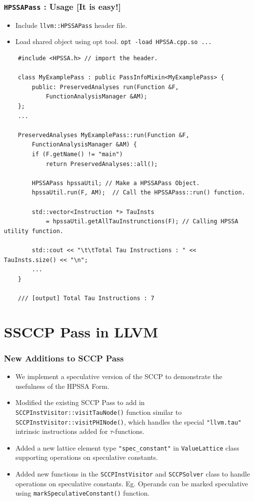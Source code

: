 \documentclass{beamer}
\begin{document}
\begin{frame}[fragile]
	\frametitle{\texttt{HPSSAPass} : Usage [It is easy!]}
	\begin{itemize}
		\item Include \texttt{llvm::HPSSAPass} header file.
		\item Load shared object using opt tool. \texttt{opt -load HPSSA.cpp.so ...} 
	\end{itemize}
	\begin{verbatim}
	#include <HPSSA.h> // import the header.
	
	class MyExamplePass : public PassInfoMixin<MyExamplePass> {
		public: PreservedAnalyses run(Function &F, 
			FunctionAnalysisManager &AM);
	};
	...
	
	PreservedAnalyses MyExamplePass::run(Function &F, 
		FunctionAnalysisManager &AM) {
		if (F.getName() != "main")
			return PreservedAnalyses::all();
	
		HPSSAPass hpssaUtil; // Make a HPSSAPass Object.
		hpssaUtil.run(F, AM);  // Call the HPSSAPass::run() function.
	
		std::vector<Instruction *> TauInsts 
			= hpssaUtil.getAllTauInstrunctions(F); // Calling HPSSA utility function.
			
		std::cout << "\t\tTotal Tau Instructions : " << TauInsts.size() << "\n";
		...
	}
	
	/// [output] Total Tau Instructions : 7 
	\end{verbatim}
\end{frame}

\section{SSCCP Pass in LLVM}

\begin{frame}
	\frametitle{New Additions to SCCP Pass}
	\begin{itemize}
		\item We implement a speculative version of the SCCP to demonstrate the usefulness of the HPSSA Form.
		\item Modified the existing SCCP Pass to add in \texttt{SCCPInstVisitor::visitTauNode()} function similar to \texttt{SCCPInstVisitor::visitPHINode()}, which handles the special \texttt{"llvm.tau"} intrinsic instructions added for $\tau$-functions.
		\item Added a new lattice element type \texttt{"spec_constant"} in \texttt{ValueLattice} class supporting operations on speculative constants. 
		\item Added new functions in the \texttt{SCCPInstVisitor} and \texttt{SCCPSolver} class to handle operations on speculative constants. Eg. Operands can be marked speculative using \texttt{markSpeculativeConstant()} function.
	\end{itemize}
\end{frame}
\end{document}
